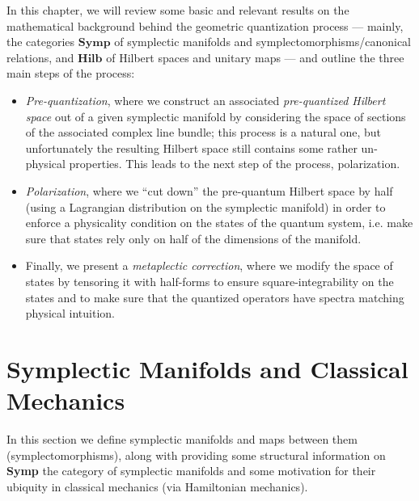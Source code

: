 In this chapter, we will review some basic and relevant results on the mathematical background behind the geometric quantization process --- mainly, the categories $\mathbf{Symp}$ of symplectic manifolds and symplectomorphisms/canonical relations, and $\mathbf{Hilb}$ of Hilbert spaces and unitary maps --- and outline the three main steps of the process:
\begin{itemize}
\item \emph{Pre-quantization}, where we construct an associated \emph{pre-quantized Hilbert space} out of a given symplectic manifold by considering the space of sections of the associated complex line bundle; this process is a natural one, but unfortunately the resulting Hilbert space still contains some rather un-physical properties. This leads to the next step of the process, polarization.
\item \emph{Polarization}, where we ``cut down'' the pre-quantum Hilbert space by half (using a Lagrangian distribution on the symplectic manifold) in order to enforce a physicality condition on the states of the quantum system, i.e. make sure that states rely only on half of the dimensions of the manifold.
\item Finally, we present a \emph{metaplectic correction}, where we modify the space of states by tensoring it with half-forms to ensure square-integrability on the states and to make sure that the quantized operators have spectra matching physical intuition.
\end{itemize}










\section{Symplectic Manifolds and Classical Mechanics}
In this section we define symplectic manifolds and maps between them (symplectomorphisms), along with providing some structural information on \textbf{Symp} the category of symplectic manifolds and some motivation for their ubiquity in classical mechanics (via Hamiltonian mechanics).


